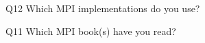\begin{description}%
\item{Q12} Which MPI implementations do you use?%
\item{Q11} Which MPI book(s) have you read?%
\end{description}%
